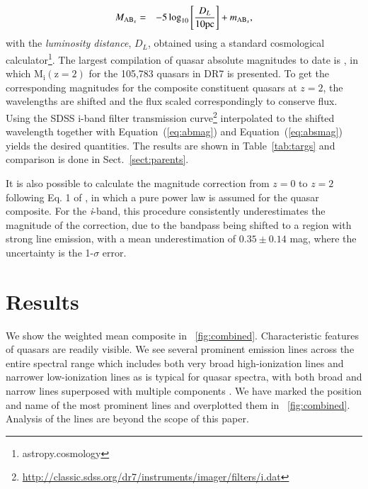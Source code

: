 \documentclass{aa}    %
\newcommand{\figref}[1]{\ref{fig:#1}}
\newcommand{\Fig}[1]{\figurename~\figref{#1}}
\newcommand{\fig}[1]{\Fig{#1}}
\newcommand{\Tab}[1]{Table~\ref{tab:#1}}
\newcommand{\tab}[1]{\Tab{#1}}
\newcommand{\Eq}[1]{Equation~(\ref{eq:#1})}
\newcommand{\eq}[1]{\Eq{#1}}
\newcommand{\eqlabel}[1]{\label{eq:#1}}
\newcommand{\sectionname}{Sect.}
\newcommand{\Sect}[1]{\sectionname~\ref{sect:#1}}
\newcommand{\sect}[1]{\Sect{#1}}
\newcommand{\sectlabel}[1]{\label{sect:#1}}
\begin{document}
\begin{eqnarray}\eqlabel{absmag}
M_{\textmd{AB}_x} &=& -5 \log_{10} \left[  \frac{D_L }{10 \mathrm{pc}}   \right]
+ m_{\textmd{AB}_x} ,
\end{eqnarray}
with the \textit{luminosity distance}, $D_L$,  obtained using a standard
cosmological calculator\footnote{astropy.cosmology}.
 The largest compilation of quasar absolute magnitudes to date is
\cite{Shen2011}, in which $\mathrm{M_i (z=2)}$ for the 105,783 quasars in DR7 is
presented. To get the corresponding magnitudes for the composite constituent
quasars at $z = 2$, the wavelengths are shifted and the flux scaled
correspondingly to conserve flux. Using the SDSS i-band filter transmission
curve\footnote{\url{http://classic.sdss.org/dr7/instruments/imager/filters/i.dat}}
interpolated to the shifted wavelength together with \eq{abmag} and \eq{absmag}
yields the desired quantities. The results are shown in \tab{targs} and
comparison is done in \sect{parents}.
 
 It is also possible to calculate the magnitude correction from $z = 0$ to $z =
2$ following Eq. 1 of \cite{Richards2006a}, in which a pure power law is assumed
for the quasar composite. For the \textit{i}-band, this procedure consistently
underestimates the magnitude of the correction, due to the bandpass being
shifted to a region with strong line emission, with a mean underestimation of
$0.35 \pm 0.14$ mag, where the uncertainty is the 1-$\sigma$ error.







\section{Results}   \sectlabel{results}


We show the weighted mean composite in \fig{combined}. Characteristic features
of quasars are readily visible. We see several prominent emission lines across
the entire spectral range which includes both very broad high-ionization lines
and narrower low-ionization lines as is typical for quasar spectra, with both
broad and narrow lines superposed with multiple components \citep{Baldwin1995}.
We have marked the position and name of the most prominent lines and overplotted
them in \fig{combined}.  Analysis of the lines are beyond the scope of this
paper.
\end{document}
